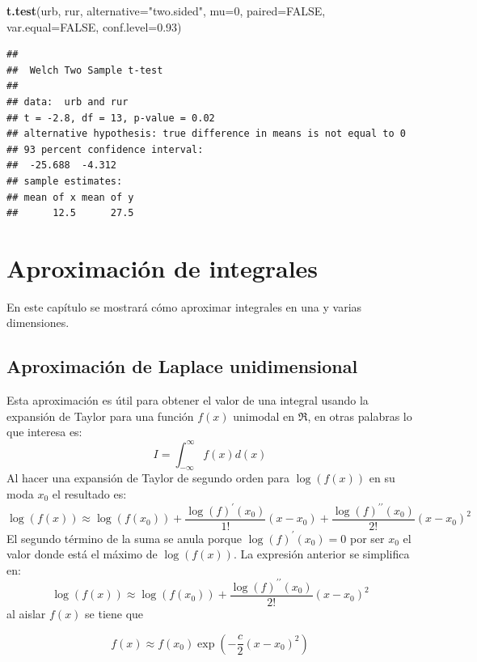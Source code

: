 \documentclass[10pt,]{krantz}
\makeatletter
\newenvironment{Shaded}{\begin{snugshade}}{\end{snugshade}}
\newcommand{\KeywordTok}[1]{\textcolor[rgb]{0.13,0.29,0.53}{\textbf{{#1}}}}
\newcommand{\DataTypeTok}[1]{\textcolor[rgb]{0.13,0.29,0.53}{{#1}}}
\newcommand{\DecValTok}[1]{\textcolor[rgb]{0.00,0.00,0.81}{{#1}}}
\newcommand{\FloatTok}[1]{\textcolor[rgb]{0.00,0.00,0.81}{{#1}}}
\newcommand{\StringTok}[1]{\textcolor[rgb]{0.31,0.60,0.02}{{#1}}}
\newcommand{\OtherTok}[1]{\textcolor[rgb]{0.56,0.35,0.01}{{#1}}}
\newcommand{\NormalTok}[1]{{#1}}
\newenvironment{kframe}{%
\medskip{}
\setlength{\fboxsep}{.8em}
 \def\at@end@of@kframe{}%
 \ifinner\ifhmode%
  \def\at@end@of@kframe{\end{minipage}}%
  \begin{minipage}{\columnwidth}%
 \fi\fi%
 \def\FrameCommand##1{\hskip\@totalleftmargin \hskip-\fboxsep
 \colorbox{shadecolor}{##1}\hskip-\fboxsep
     \hskip-\linewidth \hskip-\@totalleftmargin \hskip\columnwidth}%
 \MakeFramed {\advance\hsize-\width
   \@totalleftmargin\z@ \linewidth\hsize
   \@setminipage}}%
 {\par\unskip\endMakeFramed%
 \at@end@of@kframe}
\renewenvironment{Shaded}{\begin{kframe}}{\end{kframe}}
\makeatother
\begin{document}
\begin{Shaded}
\begin{Highlighting}[]
\KeywordTok{t.test}\NormalTok{(urb, rur, }\DataTypeTok{alternative=}\StringTok{"two.sided"}\NormalTok{, }\DataTypeTok{mu=}\DecValTok{0}\NormalTok{, }
       \DataTypeTok{paired=}\OtherTok{FALSE}\NormalTok{, }\DataTypeTok{var.equal=}\OtherTok{FALSE}\NormalTok{, }\DataTypeTok{conf.level=}\FloatTok{0.93}\NormalTok{)}
\end{Highlighting}
\end{Shaded}

\begin{verbatim}
## 
##  Welch Two Sample t-test
## 
## data:  urb and rur
## t = -2.8, df = 13, p-value = 0.02
## alternative hypothesis: true difference in means is not equal to 0
## 93 percent confidence interval:
##  -25.688  -4.312
## sample estimates:
## mean of x mean of y 
##      12.5      27.5
\end{verbatim}

\chapter{\texorpdfstring{Aproximación de integrales
\label{aproxint}}{Aproximación de integrales }}\label{aproximacion-de-integrales}

En este capítulo se mostrará cómo aproximar integrales en una y varias
dimensiones.

\section{Aproximación de Laplace
unidimensional}\label{aproximacion-de-laplace-unidimensional}

Esta aproximación es útil para obtener el valor de una integral usando
la expansión de Taylor para una función \(f(x)\) unimodal en \(\Re\), en
otras palabras lo que interesa es:
\[ I = \int_{-\infty}^{\infty} f(x) d(x)\] Al hacer una expansión de
Taylor de segundo orden para \(\log(f(x))\) en su moda \(x_0\) el
resultado es:
\[ \log(f(x)) \approx \log(f(x_0)) + \frac{\log(f)^\prime(x_0)}{1!} (x-x_0) + \frac{\log(f)^{\prime \prime}(x_0)}{2!} (x-x_0)^2 \]
El segundo término de la suma se anula porque \(\log(f)^\prime(x_0)=0\)
por ser \(x_0\) el valor donde está el máximo de \(\log(f(x))\). La
expresión anterior se simplifica en:
\[ \log(f(x)) \approx \log(f(x_0)) + \frac{\log(f)^{\prime \prime}(x_0)}{2!} (x-x_0)^2 \]
al aislar \(f(x)\) se tiene que

\begin{equation} \label{fx}
f(x) \approx f(x_0)  \exp \left( -\frac{c}{2} (x-x_0)^2 \right)
\end{equation}
\end{document}
